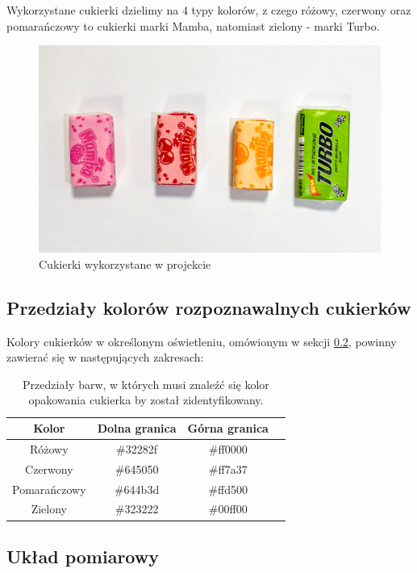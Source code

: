 \documentclass{article}
\begin{document}
Wykorzystane cukierki dzielimy na 4 typy kolorów, z czego różowy, czerwony oraz pomarańczowy to cukierki marki Mamba, natomiast zielony - marki Turbo.

\begin{figure}[H]
    \centering
    \includegraphics[width=\linewidth]{candies.jpg}
    \caption{Cukierki wykorzystane w projekcie}
\end{figure}


\subsection{Przedziały kolorów rozpoznawalnych cukierków}

Kolory cukierków w określonym oświetleniu, omówionym w sekcji \ref{Układ pomiarowy}, powinny zawierać się w następujących zakresach:

\begin{table}[H]
    \label{tab:tab1}
    \centering
    \begin{tabular}{ |c|c|c|c| }
     \hline
     Kolor & Dolna granica & Górna granica \\
     \hline
     Różowy & \#32282f & \#ff0000 \\
     \hline
     Czerwony & \#645050 & \#ff7a37 \\
     \hline
     Pomarańczowy & \#644b3d & \#ffd500 \\
     \hline
     Zielony & \#323222 & \#00ff00 \\
     \hline
    \end{tabular}
    \caption{Przedziały barw, w których musi znaleźć się kolor opakowania cukierka by został zidentyfikowany.}
\end{table}

\subsection{Układ pomiarowy}
\label{Układ pomiarowy}
\end{document}
